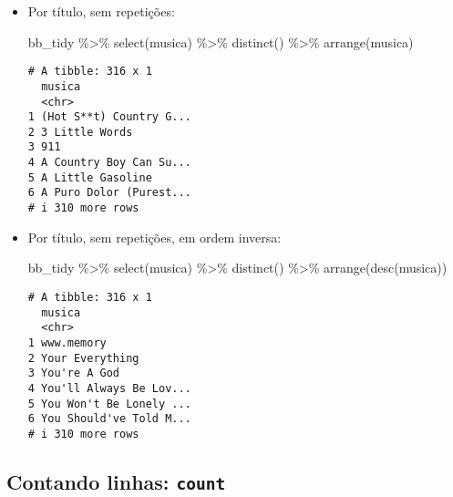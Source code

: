\documentclass[
  letterpaper,
  DIV=11,
  numbers=noendperiod]{scrreprt}
\newenvironment{Shaded}{\begin{snugshade}}{\end{snugshade}}
\newcommand{\FunctionTok}[1]{\textcolor[rgb]{0.28,0.35,0.67}{#1}}
\newcommand{\NormalTok}[1]{\textcolor[rgb]{0.00,0.23,0.31}{#1}}
\newcommand{\SpecialCharTok}[1]{\textcolor[rgb]{0.37,0.37,0.37}{#1}}
\begin{document}
\begin{itemize}
\item
  Por título, sem repetições:

\begin{Shaded}
\begin{Highlighting}[]
\NormalTok{bb\_tidy }\SpecialCharTok{\%\textgreater{}\%} 
  \FunctionTok{select}\NormalTok{(musica) }\SpecialCharTok{\%\textgreater{}\%} 
  \FunctionTok{distinct}\NormalTok{() }\SpecialCharTok{\%\textgreater{}\%} 
  \FunctionTok{arrange}\NormalTok{(musica)}
\end{Highlighting}
\end{Shaded}

\begin{verbatim}
# A tibble: 316 x 1
  musica                 
  <chr>                  
1 (Hot S**t) Country G...
2 3 Little Words         
3 911                    
4 A Country Boy Can Su...
5 A Little Gasoline      
6 A Puro Dolor (Purest...
# i 310 more rows
\end{verbatim}
\item
  Por título, sem repetições, em ordem inversa:

\begin{Shaded}
\begin{Highlighting}[]
\NormalTok{bb\_tidy }\SpecialCharTok{\%\textgreater{}\%} 
  \FunctionTok{select}\NormalTok{(musica) }\SpecialCharTok{\%\textgreater{}\%} 
  \FunctionTok{distinct}\NormalTok{() }\SpecialCharTok{\%\textgreater{}\%} 
  \FunctionTok{arrange}\NormalTok{(}\FunctionTok{desc}\NormalTok{(musica))}
\end{Highlighting}
\end{Shaded}

\begin{verbatim}
# A tibble: 316 x 1
  musica                 
  <chr>                  
1 www.memory             
2 Your Everything        
3 You're A God           
4 You'll Always Be Lov...
5 You Won't Be Lonely ...
6 You Should've Told M...
# i 310 more rows
\end{verbatim}
\end{itemize}

\subsection{\texorpdfstring{Contando linhas:
\texttt{count}}{Contando linhas: count}}\label{contando-linhas-count}
\end{document}
